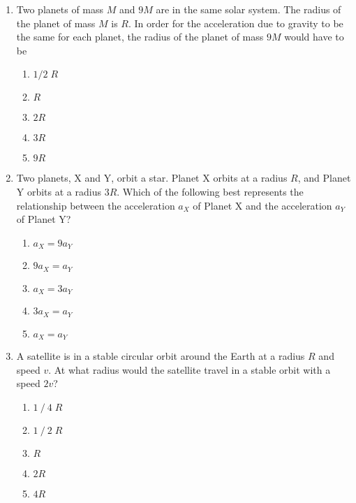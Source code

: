\documentclass{../../oss-apphys}
\begin{document}
\begin{multicols}{2}
\begin{enumerate}[leftmargin=18pt]
  \item Two planets of mass $M$ and $9M$ are in the same solar system. The
    radius of the planet of mass $M$ is $R$. In order for the acceleration due
    to gravity to be the same for each planet, the radius of the planet of mass
    $9M$ would have to be
    \begin{enumerate}[noitemsep,topsep=0pt,leftmargin=18pt]
    \item $1/2\;R$
    \item $R$
    \item $2R$
    \item $3R$
    \item $9R$
    \end{enumerate}
    \vspace{-0.5in}
  \item Two planets, X and Y, orbit a star. Planet X orbits at a radius $R$, and
    Planet Y orbits at a radius $3R$. Which of the following best represents
    the relationship between the acceleration $a_X$ of Planet X and the
    acceleration $a_Y$ of Planet Y?
    \begin{center}
    \end{center}
    \begin{enumerate}[noitemsep,topsep=0pt,leftmargin=18pt]  
    \item $a_X = 9a_Y$
    \item $9a_X = a_Y$
    \item $a_X = 3a_Y$
    \item $3a_X = a_Y$
    \item $a_X = a_Y$
    \end{enumerate}
  \item A satellite is in a stable circular orbit around the Earth at a radius
    $R$ and speed $v$. At what radius would the satellite travel in a stable
    orbit with a speed $2v$?
    \begin{enumerate}[noitemsep,topsep=0pt,leftmargin=18pt]  
    \item $1⁄4\;R$
    \item $1⁄2\;R$
    \item $R$
    \item $2R$
    \item $4R$
    \end{enumerate}


\end{enumerate}
\end{multicols}
\end{document}
